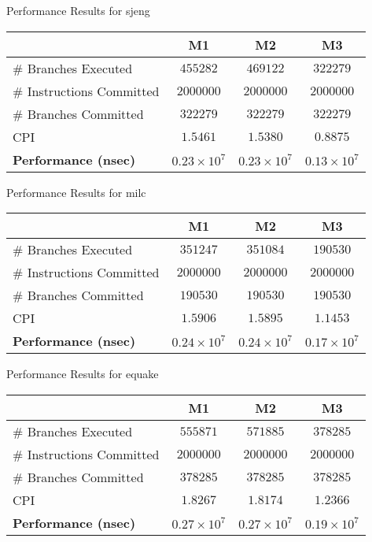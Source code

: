 \documentclass[10pt]{article} %
\begin{document}
\begin{enumerate}
\begin{center}
Performance Results for sjeng

\begin{tabular}{|l|c|c|c|}
\hline
 & M1 & M2 & M3 \\
\hline
\# Branches Executed & $455282$ & $469122$ & $322279$ \\
\# Instructions Committed & $2000000$ & $2000000$ & $2000000$ \\
\# Branches Committed & $322279$ & $322279$ & $322279$ \\
CPI & $1.5461$ & $1.5380$ & $0.8875$ \\
\hline
\textbf{Performance (nsec)} & $0.23 \times 10^{7}$ & $0.23 \times 10^{7}$ & $0.13 \times 10^{7}$ \\
\hline
\end{tabular}
\end{center}

\begin{center}
Performance Results for milc

\begin{tabular}{|l|c|c|c|}
\hline
 & M1 & M2 & M3 \\
\hline
\# Branches Executed & $351247$ & $351084$ & $190530$ \\
\# Instructions Committed & $2000000$ & $2000000$ & $2000000$ \\
\# Branches Committed & $190530$ & $190530$ & $190530$ \\
CPI & $1.5906$ & $1.5895$ & $1.1453$ \\
\hline
\textbf{Performance (nsec)} & $0.24 \times 10^{7}$ & $0.24 \times 10^{7}$ & $0.17 \times 10^{7}$ \\
\hline
\end{tabular}
\end{center}

\begin{center}
Performance Results for equake

\begin{tabular}{|l|c|c|c|}
\hline
 & M1 & M2 & M3 \\
\hline
\# Branches Executed & $555871$ & $571885$ & $378285$ \\
\# Instructions Committed & $2000000$ & $2000000$ & $2000000$ \\
\# Branches Committed & $378285$ & $378285$ & $378285$ \\
CPI & $1.8267$ & $1.8174$ & $1.2366$ \\
\hline
\textbf{Performance (nsec)} & $0.27 \times 10^{7}$ & $0.27 \times 10^{7}$ & $0.19 \times 10^{7}$ \\
\hline
\end{tabular}
\end{center}


\end{enumerate}
\end{document}
